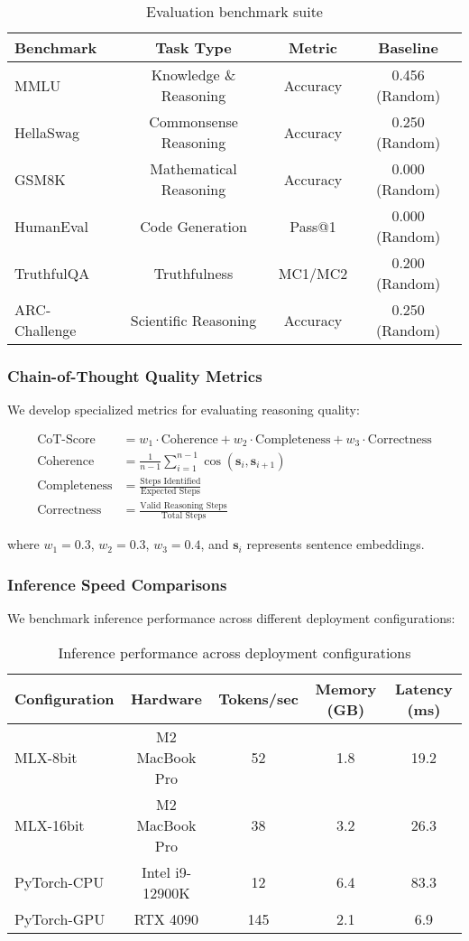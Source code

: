 \begin{table}[H]
\centering
\begin{tabular}{lccc}
\toprule
Benchmark & Task Type & Metric & Baseline \\
\midrule
MMLU & Knowledge \& Reasoning & Accuracy & 0.456 (Random) \\
HellaSwag & Commonsense Reasoning & Accuracy & 0.250 (Random) \\
GSM8K & Mathematical Reasoning & Accuracy & 0.000 (Random) \\
HumanEval & Code Generation & Pass@1 & 0.000 (Random) \\
TruthfulQA & Truthfulness & MC1/MC2 & 0.200 (Random) \\
ARC-Challenge & Scientific Reasoning & Accuracy & 0.250 (Random) \\
\bottomrule
\end{tabular}
\caption{Evaluation benchmark suite}
\label{tab:benchmarks}
\end{table}

\subsubsection{Chain-of-Thought Quality Metrics}
We develop specialized metrics for evaluating reasoning quality:

\begin{align}
\text{CoT-Score} &= w_1 \cdot \text{Coherence} + w_2 \cdot \text{Completeness} + w_3 \cdot \text{Correctness} \\
\text{Coherence} &= \frac{1}{n-1} \sum_{i=1}^{n-1} \cos(\mathbf{s}_i, \mathbf{s}_{i+1}) \\
\text{Completeness} &= \frac{\text{Steps Identified}}{\text{Expected Steps}} \\
\text{Correctness} &= \frac{\text{Valid Reasoning Steps}}{\text{Total Steps}}
\end{align}

where $w_1 = 0.3$, $w_2 = 0.3$, $w_3 = 0.4$, and $\mathbf{s}_i$ represents sentence embeddings.

\subsubsection{Inference Speed Comparisons}
We benchmark inference performance across different deployment configurations:

\begin{table}[H]
\centering
\begin{tabular}{lcccc}
\toprule
Configuration & Hardware & Tokens/sec & Memory (GB) & Latency (ms) \\
\midrule
MLX-8bit & M2 MacBook Pro & 52 & 1.8 & 19.2 \\
MLX-16bit & M2 MacBook Pro & 38 & 3.2 & 26.3 \\
PyTorch-CPU & Intel i9-12900K & 12 & 6.4 & 83.3 \\
PyTorch-GPU & RTX 4090 & 145 & 2.1 & 6.9 \\
\bottomrule
\end{tabular}
\caption{Inference performance across deployment configurations}
\label{tab:inference-performance}
\end{table}

